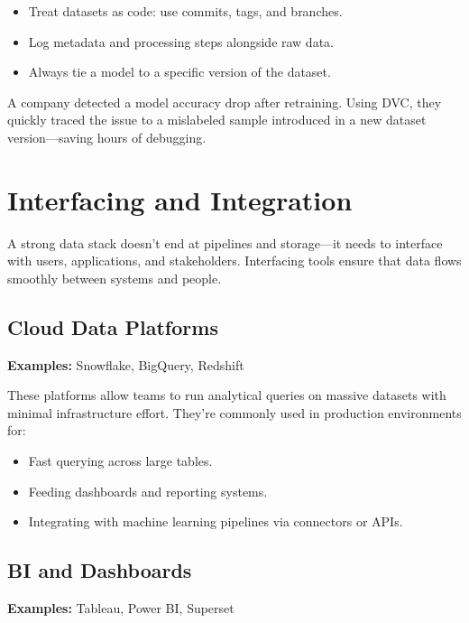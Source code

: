 \documentclass[12pt,openany]{book}
\begin{document}
\begin{itemize}
    \item Treat datasets as code: use commits, tags, and branches.
    \item Log metadata and processing steps alongside raw data.
    \item Always tie a model to a specific version of the dataset.
\end{itemize}

\begin{examplebox}
A company detected a model accuracy drop after retraining. Using DVC, they quickly traced the issue to a mislabeled sample introduced in a new dataset version—saving hours of debugging.
\end{examplebox}


\section{Interfacing and Integration}

A strong data stack doesn’t end at pipelines and storage—it needs to interface with users, applications, and stakeholders. Interfacing tools ensure that data flows smoothly between systems and people.

\subsection*{Cloud Data Platforms}

\textbf{Examples:} Snowflake, BigQuery, Redshift \newline

These platforms allow teams to run analytical queries on massive datasets with minimal infrastructure effort. They're commonly used in production environments for:

\begin{itemize}
    \item Fast querying across large tables.
    \item Feeding dashboards and reporting systems.
    \item Integrating with machine learning pipelines via connectors or APIs.
\end{itemize}

\subsection*{BI and Dashboards}

\textbf{Examples:} Tableau, Power BI, Superset \newline
\end{document}

